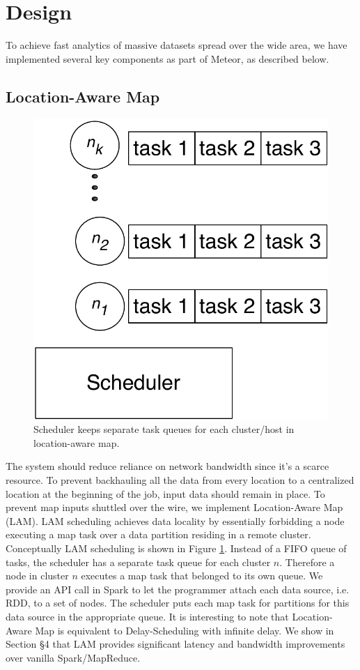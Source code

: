 \section{Design}
\label{sec: design}

To achieve fast analytics of massive datasets spread over the wide area, we have implemented several key components as part of Meteor, as described below.

\subsection{Location-Aware Map}

\begin{figure}[!ht]
\centering\includegraphics[width=0.5\columnwidth]{figs/lam.pdf}
\vspace{-1.2em}
\caption{Scheduler keeps separate task queues for each cluster/host in location-aware map.}
\label{fig:lam}
\vspace{.7em}
\end{figure}

The system should reduce reliance on network bandwidth since it's a scarce resource. To prevent backhauling
all the data from every location to a centralized location at the beginning of the job, input data should remain in place. To prevent map inputs shuttled over the wire, we implement Location-Aware Map (LAM). LAM scheduling achieves data locality by essentially forbidding a node executing a map task over a data partition residing in a remote cluster. Conceptually LAM scheduling is shown in Figure \ref{fig:lam}. Instead of a FIFO queue of tasks, the scheduler has a separate task queue for each cluster $n$. Therefore a node in cluster $n$ executes a map task that
belonged to its own queue. We provide an API call in Spark to let the programmer attach each data source, i.e. RDD, to a set of nodes. The scheduler puts each map task for partitions for this data source in the appropriate queue. It is interesting to note that Location-Aware Map is equivalent to Delay-Scheduling \cite{delay-scheduling} with infinite delay.
We show in Section \S 4  that LAM provides significant latency and bandwidth improvements over vanilla Spark/MapReduce. 


